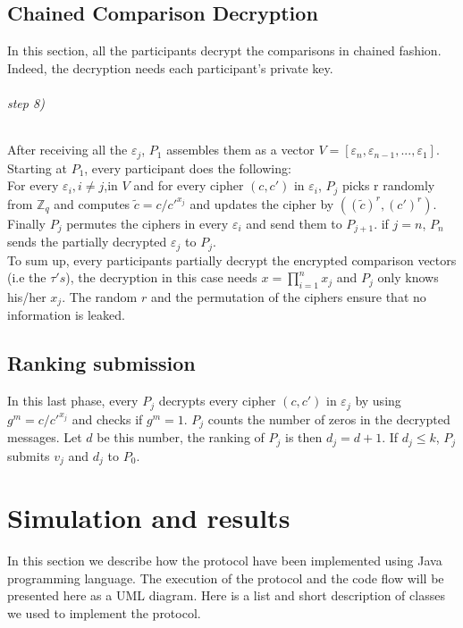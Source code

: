 \documentclass[11pt, a4paper, oneside, openright]{book} %
\begin{document}
\section{Chained Comparison Decryption}	
In this section, all the participants decrypt the comparisons in chained fashion. Indeed, the decryption needs each participant's private key. 
\subparagraph{ step 8)}
After receiving all the $\varepsilon _j$, $P_1$ assembles them as a vector $V=[\varepsilon _n,\varepsilon _{n-1},...,\varepsilon _1]$. Starting at $P_1$, every participant does the following:\\
For every $\varepsilon _i, i\neq j $,in $V$ and for every cipher $(c,c')$ in $\varepsilon _i$, $P_j$ picks r randomly from $\mathbb{Z}_q$ and computes $\tilde{c} = c/c'^{x_j}$ and updates the cipher by $((\tilde{c})^r,(c')^r)$. \\
Finally $P_j$ permutes the ciphers in every $\varepsilon _i$ and send them to $P_{j+1}$. if $j =n$, $P_n$ sends the partially decrypted $\varepsilon _j$ to $P_j$.\\
To sum up, every participants partially decrypt the encrypted comparison vectors (i.e the $\tau 's$), the decryption in this case needs $x = \prod_{i=1}^nx_j$ and $P_j$ only knows his/her $x_j$. The random $r$ and the permutation of the ciphers ensure that no information is leaked. 
\section{Ranking submission}
In this last phase, every $P_j$ decrypts every cipher $(c,c')$ in $\varepsilon _j$  by using $g^m=c/c'^{x_j}$ and checks if $g^m=1$. $P_j$ counts the number of zeros in the decrypted messages. Let $d$ be this number, the ranking of $P_j$ is then $d_j=d+1$. If $d_j \leq k$, $P_j$ submits $v_j$ and $d_j$ to $P_0$.
	

\newpage

\chapter{Simulation and results}
In this section we describe how the protocol have been implemented using Java programming language. The execution of the protocol and the code flow will be presented here as a UML diagram. Here is a list and short description of classes we used to implement the protocol.\\
\end{document}
